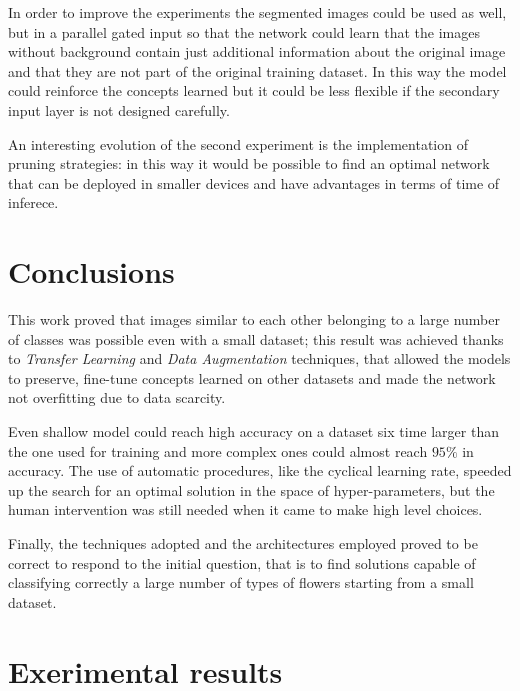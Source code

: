 In order to improve the experiments the segmented images could be used as well, but in a parallel gated input so that the network could learn that the images without background contain just additional information about the original image and that they are not part of the original training dataset. In this way the model could reinforce the concepts learned but it could be less flexible if the secondary input layer is not designed carefully. \par
An interesting evolution of the second experiment is the implementation of pruning strategies: in this way it would be possible to find an optimal network that can be deployed in smaller devices and have advantages in terms of time of inferece.



\section{Conclusions}
This work proved that images similar to each other belonging to a large number of classes was possible even with a small dataset; this result was achieved thanks to \textit{Transfer Learning} and \textit{Data Augmentation} techniques, that allowed the models to preserve, fine-tune concepts learned on other datasets and made the network not overfitting due to data scarcity. \par
Even shallow model could reach high accuracy on a dataset six time larger than the one used for training and more complex ones could almost reach $95\%$ in accuracy. The use of automatic procedures, like the cyclical learning rate, speeded up the search for an optimal solution in the space of hyper-parameters, but the human intervention was still needed when it came to make high level choices.\par
Finally, the techniques
adopted and the architectures employed proved to be correct to respond
to the initial question, that is to find solutions capable of classifying
correctly a large number of types of flowers starting from a small dataset.











\newpage
\appendix
\section{Exerimental results}\label{sec:app}


